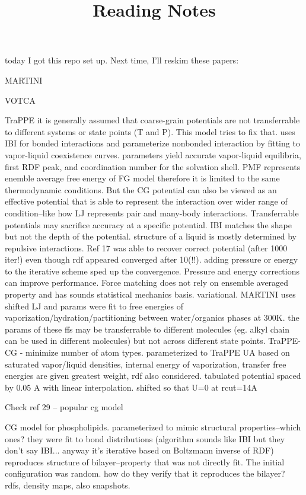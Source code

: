 \documentclass{article}
\title{Reading Notes}
\begin{document}
\title{}

today I got this repo set up. Next time, I'll reskim these papers:

MARTINI\cite{Marrink2007}

VOTCA\cite{Ruhle2009}

TraPPE\cite{Maerzke2011}
it is generally assumed that coarse-grain potentials are not transferrable to different systems or state points (T and P). This model tries to fix that. uses IBI for bonded interactions and parameterize nonbonded interaction by fitting to vapor-liquid coexistence curves. parameters yield accurate vapor-liquid equilibria, first RDF peak, and coordination number for the solvation shell.
PMF represents enemble average free energy of FG model therefore it is limited to the same thermodynamic conditions. But the CG potential can also be viewed as an effective potential that is able to represent the interaction over wider range of condition--like how LJ represents pair and many-body interactions. Transferrable potentials may sacrifice accuracy at a specific potential.
IBI matches the shape but not the depth of the potential. structure of a liquid is mostly determined by repulsive interactions. Ref 17 was able to recover correct potential (after 1000 iter!) even though rdf appeared converged after 10(!!). adding pressure or energy to the iterative scheme sped up the convergence. Pressure and energy corrections can improve performance. 
Force matching does not rely on ensemble averaged property and has sounds statistical mechanics basis. variational.
MARTINI uses shifted LJ and params were fit to free energies of vaporization/hydration/partitioning between water/organics phases at 300K. 
the params of these ffs may be transferrable to different molecules (eg. alkyl chain can be used in different molecules) but not across different state points.
TraPPE-CG - minimize number of atom types. parameterized to TraPPE UA based on saturated vapor/liquid densities, internal energy of vaporization, transfer free energies are given greatest weight, rdf also considered. tabulated potential spaced by 0.05 A with linear interpolation. shifted so that U=0 at rcut=14A

Check ref 29 -- popular cg model

\cite{Shelley2001}
CG model for phospholipids. parameterized to mimic structural properties--which ones? they were fit to bond distributions (algorithm sounds like IBI but they don't say IBI... anyway it's iterative based on Boltzmann inverse of RDF)
reproduces structure of bilayer--property that was not directly fit. The initial configuration was random. 
how do they verify that it reproduces the bilayer? rdfs, density maps, also snapshots.
\end{document}
